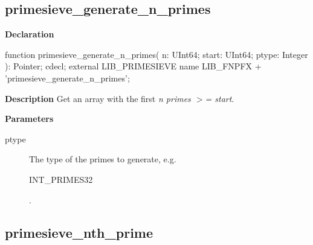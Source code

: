 \documentclass{report}
\newif\ifpdf
\begin{document}
\subsection*{primesieve{\_}generate{\_}n{\_}primes}
\fi
\label{primesieve-primesieve_generate_n_primes}
\begin{list}{}{
\setlength{\itemindent}{0cm}
\setlength{\listparindent}{0cm}
\setlength{\leftmargin}{\evensidemargin}
\addtolength{\leftmargin}{\tmplength}
\settowidth{\labelsep}{X}
\addtolength{\leftmargin}{\labelsep}
\setlength{\labelwidth}{\tmplength}
}
\item[\textbf{Declaration}\hfill]
\ifpdf
\begin{flushleft}
\fi
\begin{ttfamily}
function primesieve{\_}generate{\_}n{\_}primes( n: UInt64; start: UInt64; ptype: Integer ): Pointer; cdecl; external LIB{\_}PRIMESIEVE name LIB{\_}FNPFX + 'primesieve{\_}generate{\_}n{\_}primes';\end{ttfamily}

\ifpdf
\end{flushleft}
\fi

\par
\item[\textbf{Description}]
Get an array with the first \textit{n primes {$>$}= start}.

\par
\item[\textbf{Parameters}]
\begin{description}
\item[ptype] The type of the primes to generate, e.g. \begin{ttfamily}INT{\_}PRIMES32\end{ttfamily}.
\end{description}


\end{list}
\ifpdf
\subsection*{\large{\textbf{primesieve{\_}nth{\_}prime}}\normalsize\hspace{1ex}\hrulefill}
\else
\end{document}
